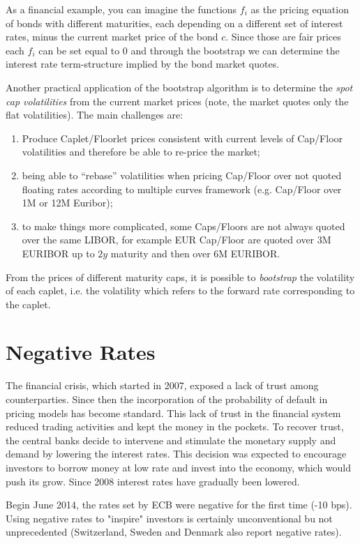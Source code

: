 \documentclass[12pt,a4paper]{book}
\begin{document}
As a financial example, you can imagine the functions $f_i$ as the pricing equation of bonds with different maturities, each depending on a different set of interest rates, minus the current market price of the bond $c$. Since those are fair prices each $f_i$ can be set equal to 0 and through the bootstrap we can determine the interest rate term-structure implied by the bond market quotes. 

Another practical application of the bootstrap algorithm is to determine the \emph{spot cap volatilities} from the current market prices (note, the market quotes only the flat volatilities).
The main challenges are:
\begin{enumerate}
	\item Produce Caplet/Floorlet prices consistent with current levels of Cap/Floor volatilities and therefore be able to re-price the market;
	\item being able to “rebase” volatilities when pricing Cap/Floor over not quoted floating rates according to multiple curves framework (e.g. Cap/Floor over 1M or 12M Euribor);
	\item to make things more complicated, some Caps/Floors are not always quoted over the same LIBOR, for example EUR Cap/Floor are quoted over 3M EURIBOR up to $2y$ maturity and then over 6M EURIBOR.
\end{enumerate}

From the prices of different maturity caps, it is possible to \emph{bootstrap} the volatility of each caplet, i.e. the volatility which refers to the forward rate corresponding to the caplet.

\section{Negative Rates}

The financial crisis, which started in 2007, exposed a lack of trust among counterparties. Since then the incorporation of the probability of default in pricing models has become standard.
This lack of trust in the financial system reduced trading activities and kept the money in the pockets.
To recover trust, the central banks decide to intervene and stimulate the monetary supply and demand by lowering the interest rates.
This decision was expected to encourage investors to borrow money at low rate and invest into the economy, which would push its grow. Since 2008 interest rates have gradually been lowered.

Begin June 2014, the rates set by ECB were negative for the first time (-10 bps). Using negative rates to "inspire" investors is certainly unconventional bu not unprecedented (Switzerland, Sweden and Denmark also report negative rates).
\end{document}
